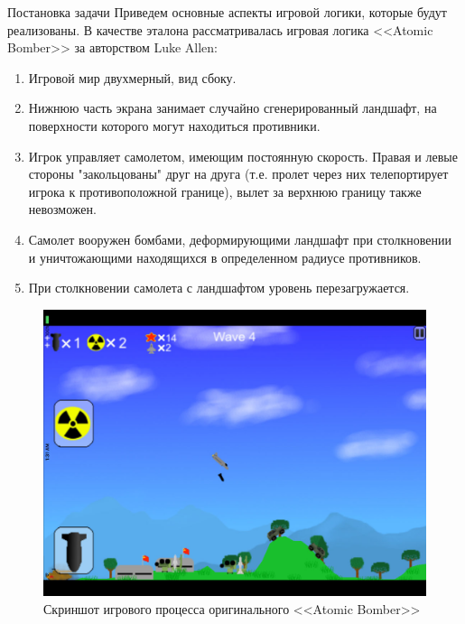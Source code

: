 \documentclass[a4paper, 14pt]{extarticle}
\begin{document}
\begin{section}{Постановка задачи}
Приведем основные аспекты игровой логики, которые будут реализованы.
В качестве эталона рассматривалась игровая логика <<Atomic Bomber>> за авторством Luke Allen:

\begin{enumerate}
\item Игровой мир двухмерный, вид сбоку.
\item Нижнюю часть экрана занимает случайно сгенерированный ландшафт, на поверхности которого могут находиться противники.
\item Игрок управляет самолетом, имеющим постоянную скорость.
Правая и левые стороны "закольцованы" друг на друга (т.е. пролет через них телепортирует игрока к противоположной границе), вылет за верхнюю границу также невозможен.
\item Самолет вооружен бомбами, деформирующими ландшафт при столкновении и уничтожающими находящихся в определенном радиусе противников.
\item При столкновении самолета с ландшафтом уровень перезагружается.
\end{enumerate}

\begin{figure}[h]
\includegraphics[width=\linewidth]{atomic-bomber}
\caption{Скриншот игрового процесса оригинального <<Atomic Bomber>>}
\end{figure}
\end{section}
\end{document}
